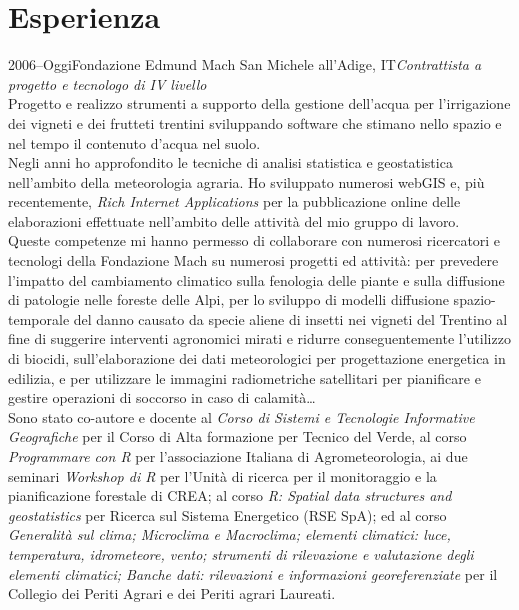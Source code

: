 \documentclass{curriculum}
\begin{document}
    
    \section{Esperienza}
    \begin{entrylist}
    \entry 
        {2006--Oggi}{Fondazione Edmund Mach} {San Michele all'Adige, IT}{\emph{Contrattista a progetto e tecnologo di IV livello}\hfill\vspace{3pt}\\
        Progetto e realizzo strumenti a supporto della gestione dell'acqua per l'irrigazione dei vigneti e dei frutteti trentini sviluppando software che stimano nello spazio e nel tempo il contenuto d'acqua nel suolo.
        \\Negli anni ho approfondito le tecniche di analisi statistica e geostatistica nell'ambito della meteorologia agraria. Ho sviluppato numerosi webGIS e, più recentemente, \textit{Rich Internet Applications} per la pubblicazione online delle elaborazioni effettuate nell'ambito delle attività del mio gruppo di lavoro. 
        \\Queste competenze mi hanno permesso di collaborare con numerosi ricercatori e tecnologi della Fondazione Mach su numerosi progetti ed attività: per prevedere l'impatto del cambiamento climatico sulla fenologia delle piante e sulla diffusione di patologie nelle foreste delle Alpi, per lo sviluppo di modelli diffusione spazio-temporale del danno causato da specie aliene di insetti nei vigneti del Trentino al fine di suggerire interventi agronomici mirati e ridurre conseguentemente l'utilizzo di biocidi, sull'elaborazione dei dati meteorologici per progettazione energetica in edilizia, e per utilizzare le immagini radiometriche satellitari per pianificare e gestire operazioni di soccorso in caso di calamità\ldots  
        \\Sono stato co-autore e docente al \textit{Corso di Sistemi e Tecnologie Informative Geografiche} per il Corso di Alta formazione per Tecnico del Verde, al corso \textit{Programmare con R} per l'associazione Italiana di Agrometeorologia, ai due seminari \textit{Workshop di R} per l'Unità di ricerca per il monitoraggio e la pianificazione forestale di CREA; al corso \textit{R: Spatial data structures and geostatistics} per Ricerca sul Sistema Energetico (RSE SpA); ed al corso \textit{Generalità sul clima; Microclima e Macroclima; elementi climatici: luce, temperatura, idrometeore, vento; strumenti di rilevazione e valutazione degli elementi climatici; Banche dati: rilevazioni e informazioni georeferenziate} per il Collegio dei Periti Agrari e dei Periti agrari Laureati.}
    \end{entrylist}
    
\end{document}
